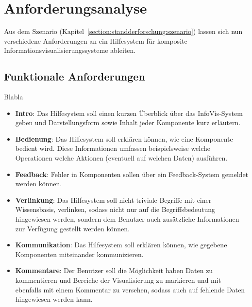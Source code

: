 \documentclass[
	headsepline,
	footsepline,
	fontsize=12pt,
	bibliography=totoc
]{scrbook}
\begin{document}
\section{Anforderungsanalyse}
\label{section:standderforschung:anforderungsanalyse}

Aus dem Szenario (Kapitel~\ref{section:standderforschung:szenario}) lassen sich nun verschiedene Anforderungen an ein Hilfesystem für komposite Informationsvisualisierungssysteme ableiten.

\subsection{Funktionale Anforderungen}
\label{section:standderforschung:anforderungsanalyse:funktionale_anforderungen}

Blabla

\begin{itemize}
	\item\textbf{Intro}: Das Hilfesystem soll einen kurzen Überblick über das InfoVis-System geben und Darstellungsform sowie Inhalt jeder Komponente kurz erläutern.
	\item\textbf{Bedienung}: Das Hilfesystem soll erklären können, wie eine Komponente bedient wird. Diese Informationen umfassen beispielsweise welche Operationen welche Aktionen (eventuell auf welchen Daten) ausführen.
	\item\textbf{Feedback}: Fehler in Komponenten sollen über ein Feedback-System gemeldet werden können.
	\item\textbf{Verlinkung}: Das Hilfesystem soll nicht-triviale Begriffe mit einer Wissensbasis‚ verlinken, sodass nicht nur auf die Begriffsbedeutung hingewiesen werden, sondern dem Benutzer auch zusätzliche Informationen zur Verfügung gestellt werden können.
	\item\textbf{Kommunikation}: Das Hilfesystem soll erklären können, wie gegebene Komponenten miteinander kommunizieren.
	\item\textbf{Kommentare}: Der Benutzer soll die Möglichkeit haben Daten zu kommentieren und Bereiche der Visualisierung zu markieren und mit ebenfalls mit einem Kommentar zu versehen, sodass auch auf fehlende Daten hingewiesen werden kann.
\end{itemize}

\end{document}
